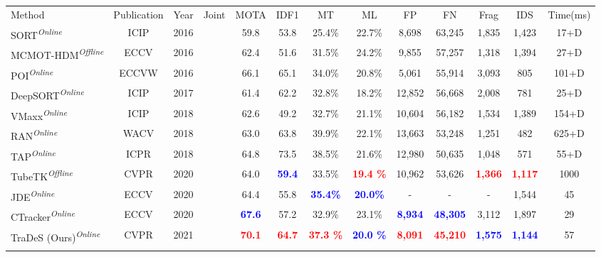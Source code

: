 \documentclass[final]{cvpr}
\begin{document}
\begin{table*}[!htb]
	\small
	\begin{center}
		\setlength{\tabcolsep}{3.35pt}
		\begin{tabular}{l|cc|c|ccccccccc}
			\shline
			\rowcolor{mygray}
			\multicolumn{13}{c}{\emph{MOT16 Test Set}}\\
			\hline
			\rowcolor{mygray}
			Method&Publication&Year&Joint&MOTA& IDF1&MT&ML&FP&FN&Frag&IDS&Time(ms)\\
			
			\hline
			\hline
			SORT\cite{bewley2016simple}\textsuperscript{\emph{Online}} &ICIP&2016&& 59.8 & 53.8 & 25.4\% & 22.7\% &8,698 &63,245&1,835&1,423 & 17+D\\
			MCMOT-HDM\cite{lee2016multi}\textsuperscript{\emph{Offline}}&ECCV &2016& & 62.4 & 51.6 & 31.5\% & 24.2\% &9,855&57,257&1,318& 1,394 & 27+D\\
			POI\cite{yu2016poi}\textsuperscript{\emph{Online}}&ECCVW &2016& & 66.1 & 65.1 & 34.0\% & 20.8\% &5,061&55,914&3,093& 805 & 101+D\\
			DeepSORT\cite{wojke2017simple}\textsuperscript{\emph{Online}}&ICIP&2017&& 61.4 & 62.2 & 32.8\% & 18.2\% &12,852 &56,668&2,008&781 & 25+D\\
			VMaxx\cite{wan2018multi}\textsuperscript{\emph{Online}} &ICIP&2018&& 62.6 & 49.2 & 32.7\% & 21.1\% &10,604	&56,182&1,534& 1,389 & 154+D\\
			RAN\cite{fang2018recurrent}\textsuperscript{\emph{Online}} &WACV&2018&& 63.0 & 63.8 & 39.9\% & 22.1\% &13,663&53,248&1,251&482 &625+D\\
			TAP\cite{zhou2018online}\textsuperscript{\emph{Online}}&ICPR&2018&& 64.8 & 73.5 & 38.5\% & 21.6\% &12,980&50,635&1,048& 571 & 55+D\\
			\hline
			TubeTK\cite{tubetk}\textsuperscript{\emph{Offline}}&CVPR&2020&\Checkmark& 64.0 & \textcolor{blue}{\bf59.4} &33.5\% & \textcolor{red}{\bf 19.4 \%} &10,962&53,626&\textcolor{red}{\bf1,366}& \textcolor{red}{\bf1,117} & 1000\\
			JDE\cite{wang2019towards}\textsuperscript{\emph{Online}}&ECCV &2020&\Checkmark& 64.4 & 55.8 & \textcolor{blue}{\bf35.4\%} & \textcolor{blue}{\bf20.0\%} &-&-&-& 1,544 & 45\\
			CTracker\textsuperscript{\emph{Online}} &ECCV &2020&\Checkmark& \textcolor{blue}{\bf67.6} & 57.2 & 32.9\% & 23.1\% &\textcolor{blue}{\bf8,934}&\textcolor{blue}{\bf48,305}&3,112& 1,897 & 29\\
			TraDeS (Ours)\textsuperscript{\emph{Online}} &CVPR&2021&\Checkmark& \textcolor{red}{\bf 70.1} & \textcolor{red}{\bf 64.7} & \textcolor{red}{\bf 37.3 \%} & \textcolor{blue}{\bf 20.0 \%} &\textcolor{red}{\bf8,091}	&\textcolor{red}{\bf45,210}&\textcolor{blue}{\bf 1,575}& \textcolor{blue}{\bf 1,144} & 57\\
			\shline 
			

\end{tabular}
\end{center}
\end{table*}
\end{document}
